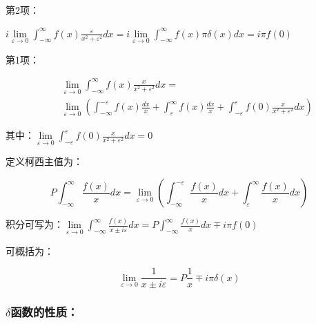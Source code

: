 第2项：

$i\mathop {\lim }\limits_{\varepsilon  \to 0} \int_{ - \infty }^\infty  {f(x)\frac{\varepsilon }{{x^2  + \varepsilon ^2 }}dx}  = i\mathop {\lim }\limits_{\varepsilon  \to 0} \int_{ - \infty }^\infty  {f(x)\pi \delta (x)} dx = i\pi f(0)$


第1项：

\begin{eqnarray*}
{} & {} & \mathop {\lim }\limits_{\varepsilon  \to 0} \int_{ - \infty }^\infty  {f(x)\frac{x}{{x^2  + \varepsilon ^2 }}dx}  = \\
{} & {} & \mathop {\lim }\limits_{\varepsilon  \to 0} \left( {\int_{ - \infty }^{ - \varepsilon } {f(x)\frac{{dx}}{x}}  + \int_\varepsilon ^\infty  {f(x)\frac{{dx}}{x}}  + \int_{ - \varepsilon }^\varepsilon  {f(0)\frac{x}{{x^2  + \varepsilon ^2 }}dx} } \right)
\end{eqnarray*}



其中：$\mathop {\lim }\limits_{\varepsilon  \to 0} \int_{ - \varepsilon }^\varepsilon  {f(0)\frac{x}{{x^2  + \varepsilon ^2 }}dx}  = 0$

定义柯西主值为：

\begin{equation}
P\int_{ - \infty }^\infty  {\frac{{f(x)}}{x}dx}  = \mathop {\lim }\limits_{\varepsilon  \to 0} \left( {\int_{ - \infty }^{ - \varepsilon } {\frac{{f(x)}}{x}dx}  + \int_\varepsilon ^\infty  {\frac{{f(x)}}{x}dx} } \right)
\end{equation}

积分可写为：$\mathop {\lim }\limits_{\varepsilon  \to 0} \int_{ - \infty }^\infty  {\frac{{f(x)}}{{x \pm i\varepsilon }}dx}  = P\int_{ - \infty }^\infty  {\frac{{f(x)}}{x}dx}  \mp i\pi f(0)$

可概括为：

\begin{center}
\begin{equation}\label{cauchy theorem 7}
    \mathop {\lim }\limits_{\varepsilon  \to 0} \frac{1}{{x \pm i\varepsilon }} = P\frac{1}{x} \mp i\pi \delta (x)
\end{equation}
\end{center}

\subsubsection{$\delta$函数的性质：}

